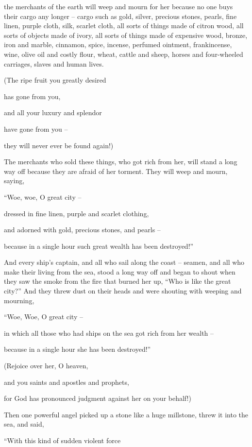 {the merchants
of the earth
will weep
and
mourn
for
her
because
no one
buys
their
cargo
any longer –
cargo
such as gold,
silver,
precious
stones,
pearls,
fine linen,
purple cloth,
silk,
scarlet cloth,
all sorts
of things made of citron wood,
all sorts
of objects
made of ivory,
all sorts
of things
made of
expensive
wood,
bronze,
iron
and
marble,
cinnamon,
spice, incense,
perfumed ointment,
frankincense,
wine,
olive oil
and
costly flour,
wheat,
cattle
and
sheep,
horses
and
four-wheeled carriages,
slaves
and
human
lives.
\par }{\Q {}(The ripe fruit
you
greatly desired
\par }{\Q has gone
from
you,
\par }{\Q and
all
your luxury
and
splendor
\par }{\Q have gone
from
you
–
\par }{\Q they will
never
ever be found again!)
\par }{\PP {}The merchants
who sold these things,
who got rich
from
her,
will stand
a long way off
because
they are afraid
of her
torment.
They will weep
and
mourn,
saying,
\par }{\Q “Woe,
woe,
O great
city
–
\par }{\Q dressed in
fine linen,
purple
and
scarlet clothing,
\par }{\Q and
adorned
with
gold,
precious
stones,
and
pearls –
\par }{\Q {}because
in a single
hour
such great
wealth
has been destroyed!”
\par }{\PP And
every
ship’s captain,
and
all
who sail
along
the coast –
seamen,
and
all
who make their living
from
the sea,
stood
a long way off
and
began to shout
when
they saw
the smoke
from the fire that burned
her
up, “Who
is like
the great
city?”
And
they threw
dust
on
their
heads
and
were shouting
with weeping
and
mourning,
\par }{\Q “Woe,
Woe,
O great
city
–
\par }{\Q in
which
all
those who had
ships
on the sea
got rich
from
her
wealth
–
\par }{\Q because
in a single
hour
she has been destroyed!”
\par }{\Q {}(Rejoice
over
her,
O heaven,
\par }{\Q and
you saints
and
apostles
and
prophets,
\par }{\Q for
God
has pronounced
judgment
against
her
on your behalf!)
\par }{\PP {}Then
one
powerful
angel
picked up
a stone
like
a huge
millstone,
threw
it into
the sea,
and said,
\par }{\Q “With this kind of
sudden violent
force

}
